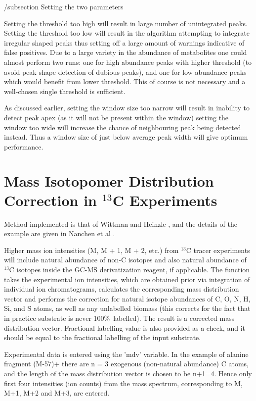 /subsection
{Setting the two parameters}

Setting the threshold too high will result in large number of unintegrated 
peaks. Setting the threshold too low will result in the algorithm attempting 
to integrate irregular shaped peaks thus setting off a large amount of warnings 
indicative of false positives. Due to a large variety in the abundance of 
metabolites one could almost perform two runs: one for high abundance peaks 
with higher threshold (to avoid peak shape detection of dubious peaks), and one 
for low abundance peaks which would benefit from lower threshold. This of course 
is not necessary and a well-chosen single threshold is sufficient. 

As discussed earlier, setting the window size too narrow will result in 
inability to detect peak apex (as it will not be present within the window) 
setting the window too wide will increase the chance of neighbouring peak being 
detected instead. Thus a window size of just below average peak width will give 
optimum performance.

\section
{Mass Isotopomer Distribution Correction in $^{13}$C Experiments}


Method implemented is that of Wittman and Heinzle \cite{wittman99}, and the details
of the example are given in Nanchen et al \cite{nanchen07}. 

Higher mass ion intensities (M, M + 1, M + 2, etc.) from $^{13}$C tracer 
experiments will include natural abundance of non-C isotopes and also natural 
abundance of $^{13}$C isotopes inside the GC-MS derivatization reagent, if 
applicable. The function takes the experimental ion intensities, which are obtained 
prior via integration of individual ion chromatograms, calculates the corresponding 
mass distribution vector and performs the correction  for natural isotope 
abundances of C, O, N, H, Si, and S atoms, as well as any unlabelled biomass (this 
corrects for the fact that in practice substrate is never 100\%\ labelled). The 
result is a corrected mass distribution vector. Fractional labelling value is also
provided as a check, and it should be equal to the fractional labelling of the
input substrate.

Experimental data is entered using the 'mdv' variable. In the example of
alanine fragment (M-57)+ \cite{nanchen07} there are n = 3 exogenous (non-natural
abundance) C atoms, and the length of the mass distribution vector
is chosen to be n+1=4. Hence only first four intensities (ion counts)
from the mass spectrum, corresponding to M, M+1, M+2 and M+3, are entered.

